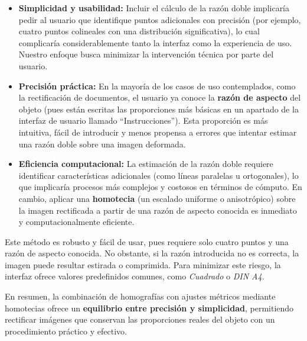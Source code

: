 \begin{itemize}
    \item \textbf{Simplicidad y usabilidad:} Incluir el cálculo de la razón doble implicaría pedir al usuario que identifique puntos adicionales con precisión (por ejemplo, cuatro puntos colineales con una distribución significativa), lo cual complicaría considerablemente tanto la interfaz como la experiencia de uso. Nuestro enfoque busca minimizar la intervención técnica por parte del usuario.
    
    \item \textbf{Precisión práctica:} En la mayoría de los casos de uso contemplados, como la rectificación de documentos, el usuario ya conoce la \textbf{razón de aspecto} del objeto (pues están escritas las proporciones más básicas en un apartado de la interfaz de usuario llamado ``Instrucciones''). Esta proporción es más intuitiva, fácil de introducir y menos propensa a errores que intentar estimar una razón doble sobre una imagen deformada.
    
    \item \textbf{Eficiencia computacional:} La estimación de la razón doble requiere identificar características adicionales (como líneas paralelas u ortogonales), lo que implicaría procesos más complejos y costosos en términos de cómputo. En cambio, aplicar una \textbf{homotecia} (un escalado uniforme o anisotrópico) sobre la imagen rectificada a partir de una razón de aspecto conocida es inmediato y computacionalmente eficiente.
\end{itemize}

Este método es robusto y fácil de usar, pues requiere solo cuatro puntos y una razón de aspecto conocida. No obstante, si la razón introducida no es correcta, la imagen puede resultar estirada o comprimida. Para minimizar este riesgo, la interfaz ofrece valores predefinidos comunes, como \textit{Cuadrado} o \textit{DIN A4}.

\vspace{\baselineskip}

En resumen, la combinación de homografías con ajustes métricos mediante homotecias ofrece un \textbf{equilibrio entre precisión y simplicidad}, permitiendo rectificar imágenes que conservan las proporciones reales del objeto con un procedimiento práctico y efectivo.